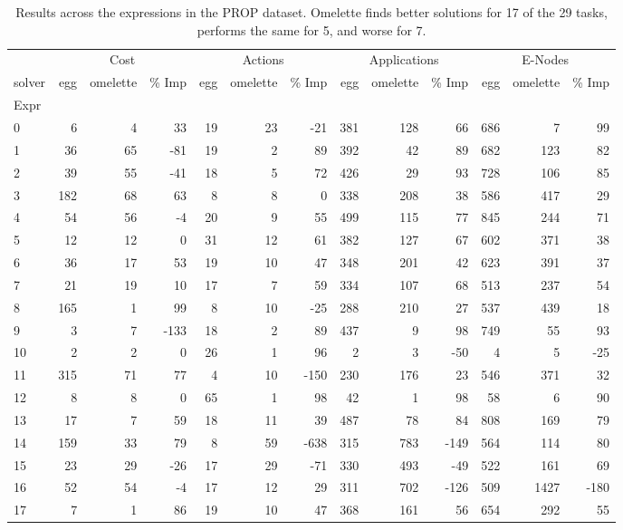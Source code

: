 \begin{table}[ht]
\centering
\caption{Results across the expressions in the PROP dataset. Omelette finds better solutions for 17 of the 29 tasks, performs the same for 5, and worse for 7.}
\label{table:prop_single_res}
\begin{tabular}{lrrrrrrrrrrrr}
\toprule
 & \multicolumn{3}{|c|}{Cost} & \multicolumn{3}{|c|}{Actions} & \multicolumn{3}{|c|}{Applications} & \multicolumn{3}{|c|}{E-Nodes} \\
solver & egg & omelette & \% Imp & egg & omelette & \% Imp & egg & omelette & \% Imp & egg & omelette & \% Imp \\
Expr &  &  &  &  &  &  &  &  &  &  &  &  \\
\midrule
0 & 6 & 4 & 33 & 19 & 23 & -21 & 381 & 128 & 66 & 686 & 7 & 99 \\
1 & 36 & 65 & -81 & 19 & 2 & 89 & 392 & 42 & 89 & 682 & 123 & 82 \\
2 & 39 & 55 & -41 & 18 & 5 & 72 & 426 & 29 & 93 & 728 & 106 & 85 \\
3 & 182 & 68 & 63 & 8 & 8 & 0 & 338 & 208 & 38 & 586 & 417 & 29 \\
4 & 54 & 56 & -4 & 20 & 9 & 55 & 499 & 115 & 77 & 845 & 244 & 71 \\
5 & 12 & 12 & 0 & 31 & 12 & 61 & 382 & 127 & 67 & 602 & 371 & 38 \\
6 & 36 & 17 & 53 & 19 & 10 & 47 & 348 & 201 & 42 & 623 & 391 & 37 \\
7 & 21 & 19 & 10 & 17 & 7 & 59 & 334 & 107 & 68 & 513 & 237 & 54 \\
8 & 165 & 1 & 99 & 8 & 10 & -25 & 288 & 210 & 27 & 537 & 439 & 18 \\
9 & 3 & 7 & -133 & 18 & 2 & 89 & 437 & 9 & 98 & 749 & 55 & 93 \\
10 & 2 & 2 & 0 & 26 & 1 & 96 & 2 & 3 & -50 & 4 & 5 & -25 \\
11 & 315 & 71 & 77 & 4 & 10 & -150 & 230 & 176 & 23 & 546 & 371 & 32 \\
12 & 8 & 8 & 0 & 65 & 1 & 98 & 42 & 1 & 98 & 58 & 6 & 90 \\
13 & 17 & 7 & 59 & 18 & 11 & 39 & 487 & 78 & 84 & 808 & 169 & 79 \\
14 & 159 & 33 & 79 & 8 & 59 & -638 & 315 & 783 & -149 & 564 & 114 & 80 \\
15 & 23 & 29 & -26 & 17 & 29 & -71 & 330 & 493 & -49 & 522 & 161 & 69 \\
16 & 52 & 54 & -4 & 17 & 12 & 29 & 311 & 702 & -126 & 509 & 1427 & -180 \\
17 & 7 & 1 & 86 & 19 & 10 & 47 & 368 & 161 & 56 & 654 & 292 & 55 \\

\end{tabular}
\end{table}

